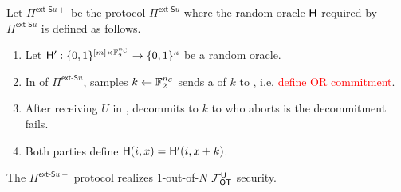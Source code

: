 \begin{definition}\label{def:ext_Su_U}
	Let $\Pi^{\textsf{ext-S}u+}$ be the protocol $\Pi^{\textsf{ext-S}u}$ where the random oracle $\mathsf{H}$ required by $\Pi^{\textsf{ext-S}u}$ is defined as follows. 
	\begin{enumerate}
		\item Let $\mathsf{H}':\{0,1\}^{[m]\times \mathbb{F}^{{n_\mathcal{C}}}_2}\rightarrow\{0,1\}^\kappa$ be a random oracle.
		\item In  of $\Pi^{\textsf{ext-S}u}$, \send samples $k\gets\mathbb{F}^{{n_\mathcal{C}}}_2$ sends a of $k$ to \rec, i.e. \textcolor{red}{define OR commitment}. 
		\item After receiving $U$ in , \send decommits to $k$ to \rec who aborts is the decommitment fails.
		\item Both parties define $\mathsf{H}(i,x)=\mathsf{H}'(i,x+k)$.
	\end{enumerate}
\end{definition}
\begin{lemma}
	The $\Pi^{\textsf{ext-S}u+}$ protocol realizes 1-out-of-$N$ $\mathcal{F}_{\mathsf{OT}}^\mathsf{U}$ security.
\end{lemma}

